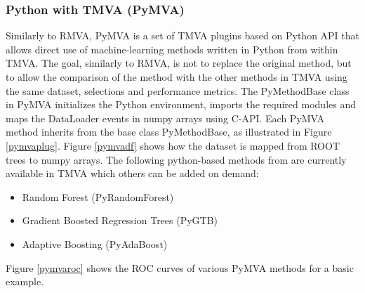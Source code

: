 \documentclass[a4paper]{jpconf}
\begin{document}



\subsubsection{Python with TMVA (PyMVA)} \label{PYMVA}
Similarly to RMVA, PyMVA is a set of TMVA plugins based on Python API that allows direct use of machine-learning methods written in Python from within TMVA. The goal, similarly to RMVA, is not to replace the original method, but to allow the comparison of the method with the other methods in TMVA using the same dataset, selections and performance metrics. 
The PyMethodBase class in PyMVA initializes the Python environment, imports the required modules and maps the DataLoader events in numpy arrays using C-API. Each PyMVA method inherits from the base class PyMethodBase, as illustrated in Figure \ref{pymvaplug}. Figure \ref{pymvadf} shows how the dataset is mapped from ROOT trees to numpy arrays. The following python-based methods from \cite{pedregosa2011scikit} are currently available in TMVA which others can be added on demand:


\begin{itemize}
\item Random Forest (PyRandomForest)
\item Gradient Boosted Regression Trees (PyGTB) 
\item Adaptive Boosting (PyAdaBoost) 
\end{itemize}

Figure \ref{pymvaroc} shows the ROC curves of various PyMVA methods for a basic example.
\end{document}
